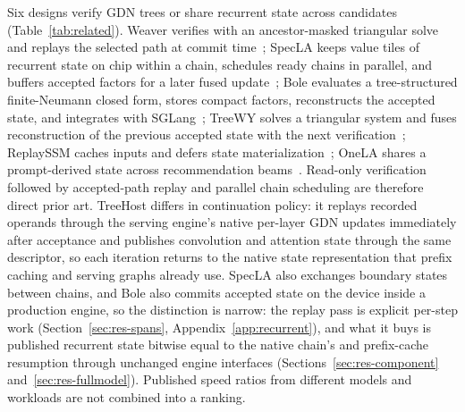 \documentclass[sigconf,anonymous,review]{acmart}
\newcommand{\sys}{TreeHost}
\begin{document}
Six designs verify GDN trees or share recurrent state across candidates (Table~\ref{tab:related}). Weaver verifies with an ancestor-masked triangular solve and replays the selected path at commit time~\cite{oda2026marginals}; SpecLA keeps value tiles of recurrent state on chip within a chain, schedules ready chains in parallel, and buffers accepted factors for a later fused update~\cite{wang2026specla}; Bole evaluates a tree-structured finite-Neumann closed form, stores compact factors, reconstructs the accepted state, and integrates with SGLang~\cite{wang2026bole}; TreeWY solves a triangular system and fuses reconstruction of the previous accepted state with the next verification~\cite{ghantasala2026treewy,ghantasala2026treewycode}; ReplaySSM caches inputs and defers state materialization~\cite{replayssm2026}; OneLA shares a prompt-derived state across recommendation beams~\cite{yang2026onela}. Read-only verification followed by accepted-path replay and parallel chain scheduling are therefore direct prior art. \sys{} differs in continuation policy: it replays recorded operands through the serving engine's native per-layer GDN updates immediately after acceptance and publishes convolution and attention state through the same descriptor, so each iteration returns to the native state representation that prefix caching and serving graphs already use. SpecLA also exchanges boundary states between chains, and Bole also commits accepted state on the device inside a production engine, so the distinction is narrow: the replay pass is explicit per-step work (Section~\ref{sec:res-spans}, Appendix~\ref{app:recurrent}), and what it buys is published recurrent state bitwise equal to the native chain's and prefix-cache resumption through unchanged engine interfaces (Sections~\ref{sec:res-component} and~\ref{sec:res-fullmodel}). Published speed ratios from different models and workloads are not combined into a ranking.
\end{document}

